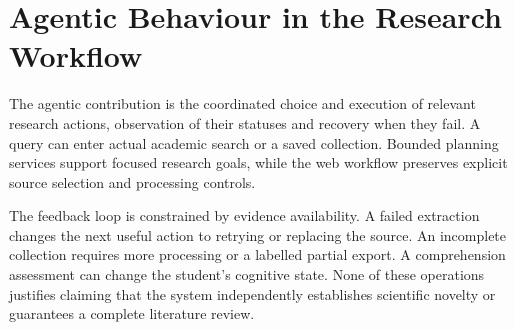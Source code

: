 \section{Agentic Behaviour in the Research Workflow}
The agentic contribution is the coordinated choice and execution of relevant research actions, observation of their statuses and recovery when they fail. A query can enter actual academic search or a saved collection. Bounded planning services support focused research goals, while the web workflow preserves explicit source selection and processing controls.

The feedback loop is constrained by evidence availability. A failed extraction changes the next useful action to retrying or replacing the source. An incomplete collection requires more processing or a labelled partial export. A comprehension assessment can change the student's cognitive state. None of these operations justifies claiming that the system independently establishes scientific novelty or guarantees a complete literature review.
